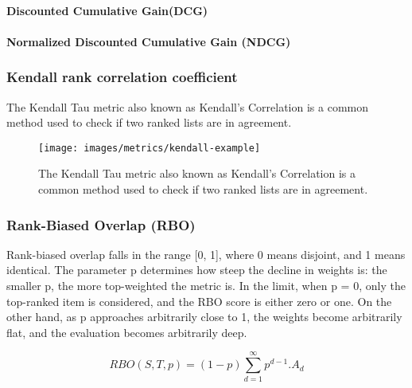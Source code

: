 \paragraph*{Discounted Cumulative Gain(DCG)}


\paragraph*{Normalized Discounted Cumulative Gain (NDCG)}

\subsubsection{Kendall rank correlation coefficient}
The Kendall Tau metric also known as Kendall’s Correlation is a common method used to check if two ranked lists are in agreement.

\begin{figure}[!h]
	\centering
	\texttt{[image: images/metrics/kendall-example]}
	\caption{The Kendall Tau metric also known as Kendall’s Correlation is a common method used to check if two ranked lists are in agreement.}
	\label{fig:kendall-rank-example}
\end{figure}

\subsubsection{Rank-Biased Overlap (RBO)}
Rank-biased overlap falls in the range [0, 1], where 0 means disjoint, and 1 means identical. The parameter p determines how steep the decline in weights is: the smaller p, the
more top-weighted the metric is. In the limit, when p = 0, only the top-ranked item is considered, and the RBO score is either zero or one. 
On the other hand, as p approaches arbitrarily close to 1, the weights become arbitrarily flat, and the evaluation becomes arbitrarily deep.

\begin{equation}
	RBO(S,T,p) = (1-p)\sum_{d=1}^{\infty}p^{d-1}.A_{d}
	\label{eq:rbo}
\end{equation}
